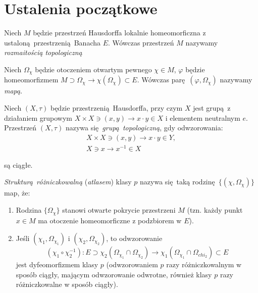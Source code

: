 \chapter{Ustalenia początkowe}
\begin{definicja}\cite[s. 253]{maurin2}
    Niech \(M\) będzie przestrzeń Hausdorffa lokalnie homeomorficzna z
    ustaloną przestrzenią Banacha \(E\). Wówczas przestrzeń \(M\) nazywamy \emph{rozmaitością
    topologiczną}
    
    Niech \(\Omega_\chi\) będzie otoczeniem otwartym pewnego \(\chi \in M\), \(\varphi\) będzie homeomorfizmem
    \(M \supset \Omega_{\chi} \rightarrow \chi(\Omega_{\chi}) \subset E\). Wówczas parę \((\varphi,
    \Omega_\chi)\) nazywamy
\emph{mapą}.

\begin{definicja}\cite[s. 41]{maurin2}
    Niech \((X, \tau)\) będzie przestrzenią Hausdorffa, przy czym \(X\) jest grupą z działaniem
    grupowym \(X\times X \ni (x, y) \rightarrow x\cdot y \in X\) i elementem neutralnym \(e\).
    Przestrzeń \((X, \tau)\) nazywa się \emph{grupą topologiczną}, gdy odwzorowania:
    \begin{align*}
        X\times X \ni (x, y) \rightarrow x \cdot y \in Y, \\ 
        X \ni x \rightarrow x^{-1} \in X
    \end{align*}
\end{definicja} są ciągłe.

\end{definicja}
\begin{definicja}\cite[s. 253]{maurin2}
\emph{Strukturą różniczkowalną} (\emph{atlasem}) klasy \(p\) nazywa się taką
rodzinę \( \{(\chi, \Omega_{\chi})\} \) map, że:
\begin{enumerate}[label=(\alph*)]
    \item Rodzina \(\{\Omega_{\chi}\}\) stanowi otwarte pokrycie przestrzeni \(M\) (tzn. każdy punkt
        \(x\in M\) ma otoczenie homeomorficzne z podzbiorem w \(E\)).
    \item Jeśli \((\chi_1, \Omega_{\chi_1})\) i \((\chi_2, \Omega_{\chi_2})\), to odwzorowanie
        \begin{equation*}
            (\chi_1 \circ \chi_2^{-1}): E \supset \chi_2(\Omega_{\chi_1} \cap \Omega_{\chi_2})
            \rightarrow \chi_1(\Omega_{\chi_1} \cap \Omega_{chi_2}) \subset E 
        \end{equation*}
        jest dyfeomorfizmem klasy \(p\) (odwzorowaniem \(p\) razy różniczkowalnym w sposób ciągły,
        mającym odwzorowanie odwrotne, również klasy \(p\) razy różniczkowalne w sposób ciągły).
\end{enumerate}
\end{definicja}
